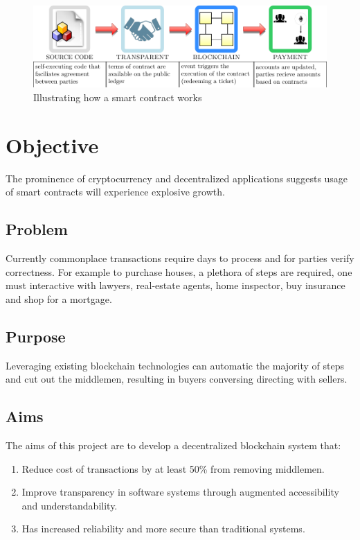 \documentclass[12pt]{scrartcl}
\begin{document}
\begin{figure}[ht]
		\centering
		\includegraphics[width=1\linewidth]{smartContractsExp.pdf}
		\caption{Illustrating how a smart contract works}
		\label{fig:smartContracts}
\end{figure}

\newpage 

\section{Objective}
The prominence of cryptocurrency and decentralized applications suggests usage of smart contracts will experience explosive growth.

\subsection{Problem}

Currently commonplace transactions require days to process and for parties verify correctness. For example to purchase houses, a plethora of steps are required, one must interactive with lawyers, real-estate agents, home inspector, buy insurance and shop for a mortgage. 

\subsection{Purpose}
Leveraging existing blockchain technologies can automatic the majority of steps and cut out the middlemen, resulting in buyers conversing directing with sellers.
\subsection{Aims}
The aims of this project are to develop a decentralized blockchain system that:
\begin{enumerate}
\item Reduce cost of transactions by at least 50\% from removing middlemen.
\item Improve transparency in software systems through augmented accessibility and understandability.
\item Has increased reliability and more secure than traditional systems.
\end{enumerate}
\end{document}
